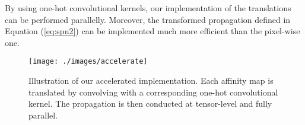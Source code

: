 \documentclass[letterpaper, 10 pt, conference]{ieeeconf}
\begin{document}
By using one-hot convolutional kernels, our implementation of the translations can be performed parallelly. Moreover, the transformed propagation defined in Equation (\ref{eq:spn2}) can be implemented much more efficient than the pixel-wise one.








\begin{figure}[ht]
	\centering
	\texttt{[image: ./images/accelerate]}
	\caption{Illustration of our accelerated implementation. Each affinity map is translated by convolving with a corresponding one-hot convolutional kernel. The propagation is then conducted at tensor-level and fully parallel.}
	\label{fig_DACSPN}
\end{figure}
\end{document}
